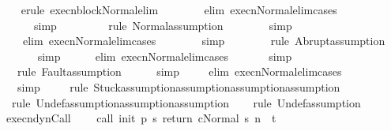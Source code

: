 \begin{isabellebody}
\ \ \isamarkupfalse%
\ {\isacharparenleft}erule\ execn{\isacharunderscore}block{\isacharunderscore}Normal{\isacharunderscore}elim{\isacharparenright}\isanewline
\ \ \isamarkupfalse%
\ \ \ \ \ {\isacharparenleft}elim\ execn{\isacharunderscore}Normal{\isacharunderscore}elim{\isacharunderscore}cases{\isacharparenright}\isanewline
\ \ \isamarkupfalse%
\ \ \ \ \ \ simp\isanewline
\ \ \isamarkupfalse%
\ \ \ \ \ \ {\isacharparenleft}rule\ Normal{\isacharcomma}assumption{\isacharplus}{\isacharparenright}\isanewline
\ \ \isamarkupfalse%
\ \ \ \ \ simp\isanewline
\ \ \isamarkupfalse%
\ \ \ \ {\isacharparenleft}elim\ execn{\isacharunderscore}Normal{\isacharunderscore}elim{\isacharunderscore}cases{\isacharparenright}\isanewline
\ \ \isamarkupfalse%
\ \ \ \ \ simp\isanewline
\ \ \isamarkupfalse%
\ \ \ \ \ {\isacharparenleft}rule\ Abrupt{\isacharcomma}assumption{\isacharplus}{\isacharparenright}\isanewline
\ \ \isamarkupfalse%
\ \ \ \ simp\isanewline
\ \ \isamarkupfalse%
\ \ \ {\isacharparenleft}elim\ execn{\isacharunderscore}Normal{\isacharunderscore}elim{\isacharunderscore}cases{\isacharparenright}\isanewline
\ \ \isamarkupfalse%
\ \ \ \ simp\isanewline
\ \ \isamarkupfalse%
\ \ \ {\isacharparenleft}rule\ Fault{\isacharcomma}assumption{\isacharplus}{\isacharparenright}\isanewline
\ \ \isamarkupfalse%
\ \ \ simp\isanewline
\ \ \isamarkupfalse%
\ \ {\isacharparenleft}elim\ execn{\isacharunderscore}Normal{\isacharunderscore}elim{\isacharunderscore}cases{\isacharparenright}\isanewline
\ \ \isamarkupfalse%
\ \ \ simp\isanewline
\ \ \isamarkupfalse%
\ \ {\isacharparenleft}rule\ Stuck{\isacharcomma}assumption{\isacharcomma}assumption{\isacharcomma}assumption{\isacharcomma}assumption{\isacharparenright}\isanewline
\ \ \isamarkupfalse%
\ \ {\isacharparenleft}rule\ Undef{\isacharcomma}assumption{\isacharcomma}assumption{\isacharcomma}assumption{\isacharparenright}\isanewline
\ \ \isamarkupfalse%
\ {\isacharparenleft}rule\ Undef{\isacharcomma}assumption{\isacharplus}{\isacharparenright}\isanewline
\ \ \isamarkupfalse%
%
\endisatagproof
{\isafoldproof}%
%
\isadelimproof
\isanewline
%
\endisadelimproof
\isanewline
{}\isamarkupfalse%
\ execn{\isacharunderscore}dynCall{\isacharcolon}\ \ \isanewline
\ \ {\isachardoublequoteopen}{\isasymlbrakk}{\isasymGamma}{\isasymturnstile}{\isasymlangle}call\ init\ {\isacharparenleft}p\ s{\isacharparenright}\ return\ c{\isacharcomma}Normal\ s{\isasymrangle}\ {\isacharequal}n{\isasymRightarrow}\ \ t{\isasymrbrakk}\ \isanewline

\end{isabellebody}
